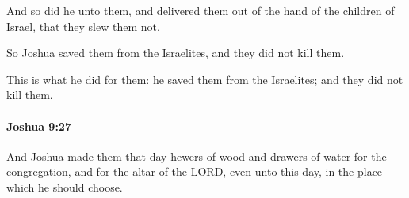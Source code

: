 			\begin{versebox}
					\item[BHS] 
					\item[ASV] And so did he unto them, and delivered them out of the hand of the children of Israel, that they slew them not.
					\item[NIV] So Joshua saved them from the Israelites, and they did not kill them.
					\item[NRSV] This is what he did for them: he saved them from the Israelites; and they did not kill them.
			\end{versebox}

		\paragraph{Joshua 9:27} %
			\label{JOSHUA-9-27}

			And Joshua made them that day hewers of wood and drawers of water for the congregation, and for the altar of the LORD, even unto this day, in the place which he should choose.

